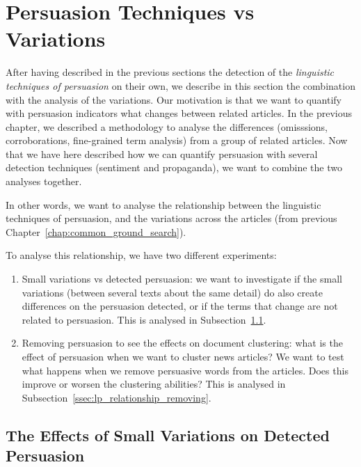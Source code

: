 \section{\statusgreen Persuasion Techniques vs Variations}
\label{sec:lp_relationship}

After having described in the previous sections the detection of the \emph{linguistic techniques of persuasion} on their own, we describe in this section the combination with the analysis of the variations.
Our motivation is that we want to quantify with persuasion indicators what changes between related articles.
In the previous chapter, we described a methodology to analyse the differences (omisssions, corroborations, fine-grained term analysis) from a group of related articles.
Now that we have here described how we can quantify persuasion with several detection techniques (sentiment and propaganda), we want to combine the two analyses together.

In other words, we want to analyse the relationship between the linguistic techniques of persuasion, and the variations across the articles (from previous Chapter~\ref{chap:common_ground_search}).

To analyse this relationship, we have two different experiments:

\begin{enumerate}
    \item Small variations vs detected persuasion: we want to investigate if the small variations (between several texts about the same detail) do also create differences on the persuasion detected, or if the terms that change are not related to persuasion. This is analysed in Subsection~\ref{ssec:lp_relationship_small_variations}.
    \item Removing persuasion to see the effects on document clustering: what is the effect of persuasion when we want to cluster news articles? We want to test what happens when we remove persuasive words from the articles. Does this improve or worsen the clustering abilities? This is analysed in Subsection~\ref{ssec:lp_relationship_removing}. %
\end{enumerate}

\subsection{\statusgreen The Effects of Small Variations on Detected Persuasion}
\label{ssec:lp_relationship_small_variations}

